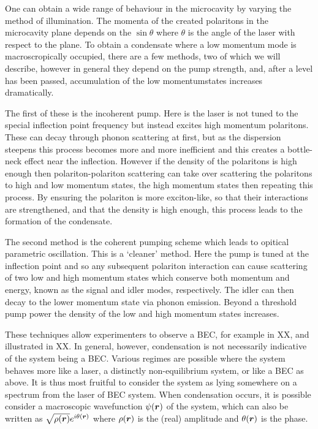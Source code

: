 One can obtain a wide range of behaviour in the microcavity by varying the method of illumination. The momenta of the created polaritons in the microcavity plane depends on the
$\sin \theta$ where $\theta$ is the angle of the laser with respect to the plane. To obtain a condensate where a low momentum mode is macroscropically occupied, there are a few methods, two of which we will describe, however in general they depend on the pump strength, and, after a level has been passed, accumulation of the low momentumstates increases dramatically.

The first of these is the incoherent pump. Here is the laser is not tuned to the special inflection point frequency but instead excites high momentum polaritons. These can decay through phonon scattering at first, but as the dispersion steepens this process becomes more and more inefficient and this creates a bottle-neck effect near the inflection. However if the density of the polaritons is high enough then polariton-polariton scattering can take over scattering the polaritons to high and low momentum states, the high momentum states then repeating this process. By ensuring the polariton is more exciton-like, so that their interactions are strengthened, and that the density is high enough, this process leads to the formation of the condensate.

The second method is the coherent pumping scheme which leads to opitical parametric oscillation. This is a `cleaner' method. Here the pump is tuned at the inflection point and so any subsequent polariton interaction can cause scattering of two low and high momentum states which conserve both momentum and energy, known as the signal and idler modes, respectively. The idler can then decay to the lower momentum state via phonon emission. Beyond a threshold pump power the density of the low and high momentum states increases.

These techniques allow experimenters to observe a BEC, for example in XX, and illustrated in XX. In general, however, condensation is not necessarily indicative of the system being a BEC. Various regimes are possible where the system behaves more like a laser, a distinctly non-equilibrium system, or like a BEC as above. It is thus most fruitful to consider the system as lying somewhere on a spectrum from the laser of BEC system. When condensation occurs, it is possible consider a macroscopic wavefunction $\psi(\boldsymbol{r})$ of the system, which can also be written as $\sqrt{\rho(\boldsymbol{r})}e^{i\theta(\boldsymbol{r})}$ where $\rho(\boldsymbol{r})$ is the (real) amplitude and $\theta(\boldsymbol{r})$ is the phase.

